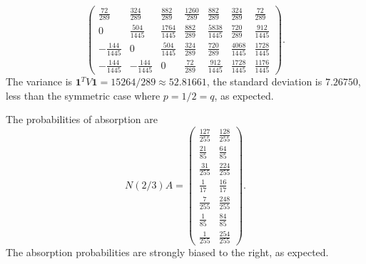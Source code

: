 \documentclass[12pt]{article}
\begin{document}
\begin{example}
\[\begin{pmatrix}
            \frac{72}{289} & \frac{324}{289} & \frac{882}{289} & \frac{1260}
            {289} & \frac{882}{289} & \frac{324}{289} & \frac{72}{289}\\
            0 & \frac{504}{1445} & \frac{1764}{1445} & \frac{882}{289} &
            \frac{5838}{1445} & \frac{720}{289} & \frac{912}{1445}\\
            -\frac{144}{1445} & 0 & \frac{504}{1445} & \frac{324}{289} &
            \frac{720}{289} & \frac{4068}{1445} & \frac{1728}{1445}\\
            -\frac{144}{1445} & -\frac{144}{1445} & 0 & \frac{72}{289} &
            \frac{912}{1445} & \frac{1728}{1445} & \frac{1176}{1445}
        \end{pmatrix}
        .
    \] %
    The variance is \( \mathbf{1}^{T} V \mathbf{1} = 15264/289 \approx
    52.81661 \), the standard deviation is \( 7.26750 \), less than the
    symmetric case where \( p =1/2 = q \), as expected.

    The probabilities of absorption are
    \[
        N(2/3) A =
        \begin{pmatrix}
            \frac{127}{255} & \frac{128}{255} \\
            \frac{21}{85} & \frac{64}{85} \\
            \frac{31}{255} & \frac{224}{255} \\
            \frac{1}{17} & \frac{16}{17} \\
            \frac{7}{255} & \frac{248}{255} \\
            \frac{1}{85} & \frac{84}{85} \\
            \frac{1}{255} & \frac{254}{255}
        \end{pmatrix}
        .
    \] The absorption probabilities are strongly biased to the right, as
    expected.
\end{example}
\end{document}
